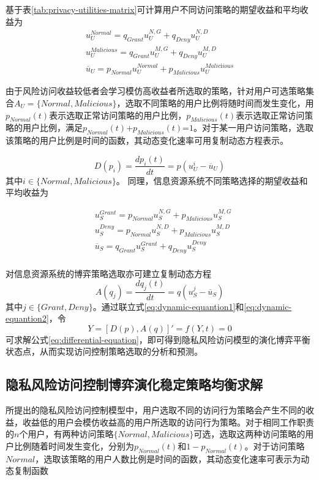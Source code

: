 基于表\ref{tab:privacy-utilities-matrix}可计算用户不同访问策略的期望收益和平均收益为
\begin{eqnarray}\label{eq:utilities-users}
u_{U}^{Normal}={{q}_{Grant}}u_{U}^{N,G}+{{q}_{Deny}}u_{U}^{N,D} \\ 
 u_{U}^{Malicious}={{q}_{Grant}}u_{U}^{M,G}+{{q}_{Deny}}u_{U}^{M,D} \\ 
{{\overline{u}}_{U}}={{p}_{Normal}}u_{U}^{Normal}+{{p}_{Malicious}}u_{U}^{Malic\text{i}ious}
\end{eqnarray}


由于风险访问收益较低者会学习模仿高收益者所选取的策略，针对用户可选策略集合${{A}_{U}}=\{Normal,Malicious\}$，选取不同策略的用户比例将随时间而发生变化，用${{p}_{Normal}}(t)$表示选取正常访问策略的用户比例，${{p}_{Malicious}}(t)$表示选取正常访问策略的用户比例，满足${{p}_{Normal}}(t)\text{+}{{p}_{Malicious}}(t)\text{=}1$。对于某一用户访问策略，选取该策略的用户比例是时间的函数，其动态变化速率可用复制动态方程表示。

\begin{equation}\label{eq:dynamic-equantion1}
D({{p}_{i}})=\frac{d{{p}_{i}}(t)}{dt}=p(u_{U}^{i}-{{\overline{u}}_{U}})
\end{equation}
其中$i\in \{Normal,Malicious\}$。
同理，信息资源系统不同策略选择的期望收益和平均收益为

\begin{align}
& u_{S}^{Grant}={{p}_{Normal}}u_{S}^{N,G}+{{p}_{Malicious}}u_{S}^{M,G} \\ 
& u_{S}^{Deny}={{p}_{Normal}}u_{S}^{N,D}+{{p}_{Malicious}}u_{S}^{M,D} \\ 
& {{\overline{u}}_{S}}={{q}_{Grant}}u_{S}^{Grant}+{{q}_{Deny}}u_{S}^{Deny} \\ 
\end{align}

对信息资源系统的博弈策略选取亦可建立复制动态方程
\begin{equation}\label{eq:dynamic-equantion2}
A({{q}_{j}})=\frac{d{{q}_{j}}(t)}{dt}=q(u_{S}^{j}-{{\overline{u}}_{S}})
\end{equation}
其中$j\in \{Grant,Deny\}$。通过联立式\ref{eq:dynamic-equantion1}和\ref{eq:dynamic-equantion2}，令
\begin{equation}\label{eq:differential-equation}
Y=[ D(p), A(q)]'=f(Y,t)=0
\end{equation}
可求解公式\ref{eq:differential-equation}，即可得到隐私风险访问模型的演化博弈平衡状态点，从而实现访问控制策略选取的分析和预测。

\subsection{隐私风险访问控制博弈演化稳定策略均衡求解}
\label{subsec:solution}
所提出的隐私风险访问控制模型中，用户选取不同的访问行为策略会产生不同的收益，收益低的用户会模仿收益高的用户所选取的访问行为策略。对于相同工作职责的$n$个用户，有两种访问策略$\{Normal, Malicious\} $可选，选取这两种访问策略的用户比例随着时间发生变化，分别为$p_{Normal}(t)$和$1-p_{Normal}(t)$。对于访问策略$Normal$，选取该策略的用户人数比例是时间的函数，其动态变化速率可表示为动态复制函数

